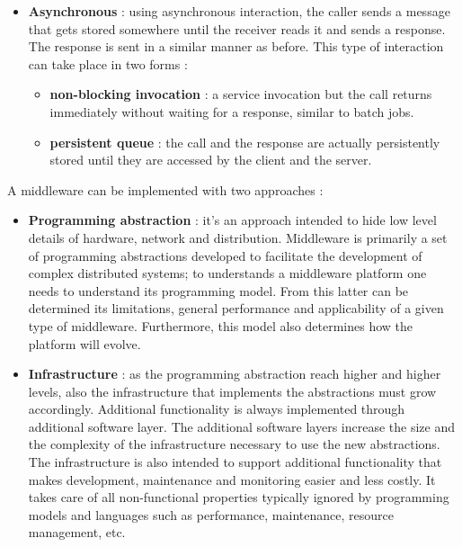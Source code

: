 \begin{itemize}
\begin{itemize}
          \end{itemize}
    \item \textbf{Asynchronous} : using asynchronous interaction, the caller sends a message that gets stored somewhere until the receiver reads it and sends a response. The response is sent in a similar manner as before. This type of interaction can take place in two forms :
          \begin{itemize}
              \item \textbf{non-blocking invocation} : a service invocation but the call returns immediately without waiting for a response, similar to batch jobs.
              \item \textbf{persistent queue} : the call and the response are actually persistently stored until they are accessed by the client and the server.
          \end{itemize}
\end{itemize}
A middleware can be implemented with two approaches :
\begin{itemize}
    \item \textbf{Programming abstraction} : it's an approach intended to hide low level details of hardware, network and distribution. Middleware is primarily a set of programming abstractions developed to facilitate the development of complex distributed systems; to understands a middleware platform one needs to understand its programming model. From this latter can be determined its limitations, general performance and applicability of a given type of middleware. Furthermore, this model also determines how the platform will evolve.
    \item \textbf{Infrastructure} : as the programming abstraction reach higher and higher levels, also the infrastructure that implements the abstractions must grow accordingly. Additional functionality is always implemented through additional software layer. The additional software layers increase the size and the complexity of the infrastructure necessary to use the new abstractions. The infrastructure is also intended to support additional functionality that makes development, maintenance and monitoring easier and less costly. It takes care of all non-functional properties typically ignored by programming models and languages such as performance, maintenance, resource management, etc.
\end{itemize}
